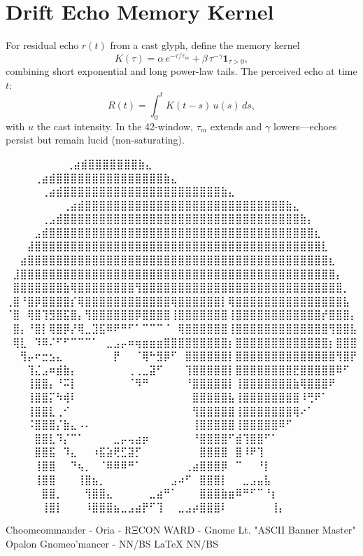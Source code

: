 
\section*{Drift Echo Memory Kernel}

For residual echo $r(t)$ from a cast glyph, define the memory kernel
\[
K(\tau)=\alpha\,e^{-\tau/\tau_m}+\beta\,\tau^{-\gamma}\mathbf{1}_{\tau>0},
\]
combining short exponential and long power-law tails.  
The perceived echo at time $t$:
\[
R(t)=\int_{0}^{t} K(t-s)\,u(s)\,ds,
\]
with $u$ the cast intensity.  
In the 42-window, $\tau_m$ extends and $\gamma$ lowers—echoes persist but remain lucid (non-saturating).

\iffalse
⠀⠀⠀⠀⠀⠀             ⠀⠀⢀⣴⣾⣿⣿⣿⣿⣿⣿⣿⣷⣄⠀⠀⠀⠀⠀⠀⠀⠀
⠀⠀⠀  ⠀      ⠀⠀⠀⠀⢀⣴⣾⣿⣿⣿⣿⣿⣿⣿⣿⣿⣿⣿⣿⣿⣿⣿⣷⣄⠀⠀⠀⠀⠀⠀⠀⠀
⠀⠀ ⠀   ⠀⠀⠀⠀⠀⢀⣴⣾⣿⣿⣿⣿⣿⣿⣿⣿⣿⣿⣿⣿⣿⣿⣿⣿⣿⣿⣿⣿⣿⣿⣷⣄⠀⠀⠀⠀⠀⠀⠀⠀
⠀⠀⠀⠀⠀⠀⠀⠀⢀⣴⣾⣿⣿⣿⣿⣿⣿⣿⣿⣿⣿⣿⣿⣿⣿⣿⣿⣿⣿⣿⣿⣿⣿⣿⣿⣿⣿⣿⣿⣷⣄⠀⠀⠀⠀⠀⠀⠀⠀
⠀⠀⠀⠀⠀⢀⣠⣾⣿⣿⣿⣿⣿⣿⣿⣿⣿⣿⣿⣿⣿⣿⣿⣿⣿⣿⣿⣿⣿⣿⣿⣿⣿⣿⣿⣿⣿⣿⣿⣿⣿⣷⡄⠀⠀⠀⠀⠀⠀
⠀⠀⠀⠀⣠⣾⣿⣿⣿⣿⣿⣿⣿⣿⣿⣿⣿⣿⣿⣿⣿⣿⣿⣿⣿⣿⣿⣿⣿⣿⣿⣿⣿⣿⣿⣿⣿⣿⣿⣿⣿⣿⣿⣆⠀⠀⠀⠀⠀
⠀⠀⠀⣼⣿⣿⣿⣿⣿⣿⣿⣿⣿⣿⣿⣿⣿⣿⣿⣿⣿⣿⣿⣿⣿⣿⣿⣿⣿⣿⣿⣿⣿⣿⣿⣿⣿⣿⣿⣿⣿⣿⣿⣿⣇⠀⠀⠀⠀
⠀⠀⣴⣿⣿⣿⣿⣿⣿⣿⣿⣿⣿⣿⣿⣿⣿⣿⣿⣿⣿⣿⣿⣿⣿⣿⣿⣿⣿⣿⣿⣿⣿⣿⣿⣿⣿⣿⣿⣿⣿⣿⣿⣿⣿⣆⠀⠀⠀
⠀⣸⣿⣿⣿⣿⣿⣿⣿⣿⣿⣿⣿⣿⣿⣿⣿⣿⣿⣿⣿⣿⣿⣿⣿⣿⣿⣿⣿⣿⣿⣿⣿⣿⣿⣿⣿⣿⣿⣿⣿⣿⣿⣿⣿⣿⡄⠀⠀
⠀⣿⣿⣿⣿⣿⣿⣿⣷⢿⣿⣿⣿⣿⣿⣿⣿⣿⢻⣿⣿⣿⣿⣿⣿⣿⣿⣿⣿⣿⣿⣿⣿⣿⣿⣿⣿⣿⣿⣿⣿⣿⣿⣿⣿⣿⣿⡀⠀
⢀⣿⠘⣿⡿⣿⣿⣿⣿⡎⢿⣿⣿⣿⣿⣿⣿⣿⣿⣿⣿⣿⣿⢿⣿⣿⣿⣿⣿⣿⡇⢿⣿⣿⣿⣿⣿⣿⣿⣿⣿⣿⣿⣿⣿⣿⣿⣧⠀
⠈⣿⠀⢿⣿⢹⣻⣿⣯⣿⡄⢻⣿⣿⣿⣿⣿⣿⡿⣿⣿⣿⣿⢸⣿⣿⣿⣿⣿⣿⣿⢸⣿⣿⣿⣿⣿⣿⣿⣿⣿⣿⣿⣿⡞⣿⣿⣿⡄
⠀⣿⡄⠘⣿⡇⢿⣿⡿⡜⢿⣀⣹⣯⠿⠟⠛⠋⠁⠉⠉⠉⠈⠀⢿⣿⣿⣿⣿⣿⣿⢸⣿⣿⣿⣿⣿⣿⣿⣿⣿⣿⣿⣿⣿⢻⣿⣿⣧
⠀⢿⣇⠀⠹⠿⠌⠋⠋⠉⠉⠉⠁⠀⣀⣠⡤⠶⢶⣶⣶⣶⣿⣿⣿⣿⣿⣿⣿⣿⣿⡆⣿⣿⣿⣿⣿⣿⣿⣿⣿⣿⣿⣿⣿⡆⣿⣿⣿
⠀⠀⢻⡤⠖⣒⣢⣄⠀⠀⠀⠀⠀⠀⠀⡟⠀⠀⠈⢿⠓⣻⡿⠋⠀⣿⣿⣿⣿⣿⣿⡇⣿⣿⣿⣿⣿⣿⣿⣿⣿⣿⣿⣿⣿⣿⢻⣿⡟
⠀⠀⠀⢹⣌⣠⠶⣾⣷⡄⠀⠀⠀⠀⠀⠀⠀⢀⢀⣀⣽⠋⠀⠀⠀⢹⣿⣿⣿⣿⣿⡇⣿⣿⣿⣿⣿⣿⣿⣿⣟⣿⣿⣿⣿⣿⠿⠋⠀
⠀⠀⠀⢸⣿⣿⡄⠘⠭⡇⠀⠀⠀⠀⠀⠀⠀⠈⠻⠛⠀⠀⠀⠀⠀⠘⣿⣿⣿⣿⣿⡇⢸⣿⣿⣿⣿⣿⣿⣿⣷⢿⣿⣿⣿⠟⠀⠀⠀
⠀⠀⠀⢸⣿⣿⡍⠳⢾⠇⠀⠀⠀⠀⠀⠀⠀⠀⠀⠀⠀⠀⠀⠀⠀⠀⣿⣿⣿⣿⣿⣧⢸⣿⣿⣿⣿⣿⣿⣿⣿⠸⢛⠟⠁⠀⠀⠀⠀
⠀⠀⠀⢸⣿⣿⣇⢀⠊⠀⠀⠀⠀⠀⠀⠀⠀⠀⠀⠀⠀⠀⠀⠀⠀⠀⢻⣿⣿⣿⣿⣿⢸⣿⣿⣿⣿⣿⣿⣿⢿⠔⠁⠀⠀⠀⠀⠀⠀
⠀⠀⠀⠨⣿⣿⣿⡌⣷⣄⠠⠄⠀⠀⠀⠀⠀⠀⠀⠀⠀⠀⠀⠀⠀⠀⢸⣿⣿⣿⣿⣿⢸⣿⣿⣿⣿⣿⠿⠋⠀⠀⠀⠀⠀⠀⠀⠀⠀
⠀⠀⠀⠀⣿⣿⣇⠹⡌⠉⠁⠀⠀⠀⠀⣀⡤⢤⣴⡶⠀⠀⠀⠀⠀⠀⠘⣿⣿⣿⣿⠋⣾⢹⣿⣿⠋⠁⠀⠀⠀⠀⠀⠀⠀⠀⠀⠀⠀
⠀⠀⠀⠀⣿⣿⣯⠀⠹⣄⠀⠀⠰⣯⣵⢟⣋⣽⡋⠀⠀⠀⠀⠀⠀⠀⠀⣿⣿⣿⣿⠀⣿⠸⠟⢹⠀⠀⠀⠀⠀⠀⠀⠀⠀⠀⠀⠀⠀
⠀⠀⠀⠀⢸⣿⣿⠀⠀⠙⢦⡀⠀⠈⠿⠿⠿⠛⠁⠀⠀⠀⠀⠀⠀⢀⣴⣿⣿⣿⡿⠀⠉⠀⠀⠘⡇⠀⠀⠀⠀⠀⠀⠀⠀⠀⠀⠀⠀
⠀⠀⠀⠀⢸⣿⣿⠀⠀⠀⢸⣿⣦⡀⠀⠀⠀⠀⠀⠀⠀⠀⠀⣠⠴⠋⠀⣿⣿⣿⡇⠀⠀⣀⣠⣤⣧⠀⠀⠀⠀⠀⠀⠀⠀⠀⠀⠀⠀
⠀⠀⠀⠀⠀⣿⣿⡀⠀⠀⠀⢻⣿⣿⣄⠀⠀⠀⠀⠀⣀⣴⠛⠁⠀⠀⠀⣿⣿⣿⣷⣶⠿⠛⠋⠉⠘⡆⠀⠀⠀⠀⠀⠀⠀⠀⠀⠀⠀
⠀⠀⠀⠀⠀⢸⣿⡇⠀⠀⠀⠸⣿⣿⣿⣦⣀⣠⣴⡟⠋⢹⠀⠀⣀⣠⡴⣿⣿⣿⠇⠀⠀⠀⠀⠀⠀⢸⡄⠀⠀⠀⠀⠀⠀⠀⠀⠀⠀

Choomcommander - Oria - RΞCON WARD - Gnome Lt. "ASCII Banner Master"
             Opalon Gnomeo'mancer - NN/BS LaTeX{} NN/BS

